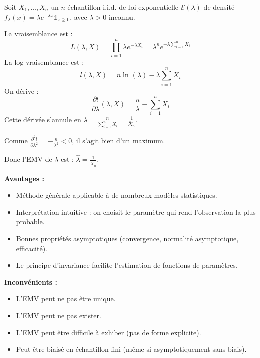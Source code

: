 \begin{exemple}
Soit $X_1, \ldots, X_n$ un $n$-échantillon i.i.d. de loi exponentielle $\mathcal{E}(\lambda)$ de densité $f_\lambda(x) = \lambda e^{-\lambda x} \mathbb{1}_{x \geq 0}$, avec $\lambda > 0$ inconnu.

La vraisemblance est :
$$
L(\lambda, X) = \prod_{i=1}^{n} \lambda e^{-\lambda X_i} = \lambda^n e^{-\lambda \sum_{i=1}^{n} X_i}
$$
La log-vraisemblance est :
$$
l(\lambda, X) = n\ln(\lambda) - \lambda \sum_{i=1}^{n} X_i
$$
On dérive :
$$
\frac{\partial l}{\partial \lambda}(\lambda, X) = \frac{n}{\lambda} - \sum_{i=1}^{n} X_i
$$
Cette dérivée s'annule en $\lambda = \frac{n}{\sum_{i=1}^{n} X_i} = \frac{1}{\bar{X}_n}$.

Comme $\frac{\partial^2 l}{\partial \lambda^2} = -\frac{n}{\lambda^2} < 0$, il s'agit bien d'un maximum.

Donc l'EMV de $\lambda$ est : $\hat{\lambda} = \frac{1}{\bar{X}_n}$.
\end{exemple}

\begin{remarque}
\textbf{Avantages :}
\begin{itemize}
\item Méthode générale applicable à de nombreux modèles statistiques.
\item Interprétation intuitive : on choisit le paramètre qui rend l'observation la plus probable.
\item Bonnes propriétés asymptotiques (convergence, normalité asymptotique, efficacité).
\item Le principe d'invariance facilite l'estimation de fonctions de paramètres.
\end{itemize}

\textbf{Inconvénients :}
\begin{itemize}
\item L'EMV peut ne pas être unique.
\item L'EMV peut ne pas exister.
\item L'EMV peut être difficile à exhiber (pas de forme explicite).
\item Peut être biaisé en échantillon fini (même si asymptotiquement sans biais).
\end{itemize}
\end{remarque}